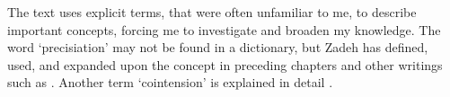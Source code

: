 
The text uses explicit terms, that were often unfamiliar to me, to describe important concepts, forcing me to investigate and broaden my knowledge. The word `precisiation' may not be found in a dictionary, but Zadeh has defined, used, and expanded upon the concept in preceding chapters and other writings such as \cite{concept_of_cointensive_precisiation}. Another term `cointension' is explained in detail \cite[2760]{is_there_a_need_for_fuzzy_logic}.








